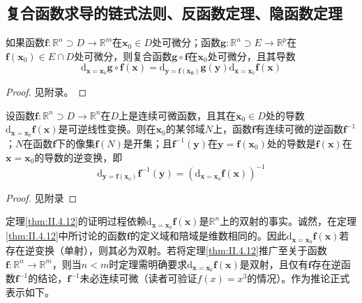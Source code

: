 \documentclass[main.tex]{subfiles}
\begin{document}
\subsection{复合函数求导的链式法则、反函数定理、隐函数定理}
\begin{theorem}[复合函数求导的链式法则]\label{thm:II.4.11}
    如果函数$\mathbf{f}:\mathbb{R}^n\supset D\rightarrow\mathbb{R}^m$在$\mathbf{x}_0\in D$处可微分；函数$\mathbf{g}:\mathbb{R}^n\supset E\rightarrow\mathbb{R}^p$在$\mathbf{f}\left(\mathbf{x}_0\right)\in E\cap D$处可微分，则复合函数$\mathbf{g}\circ\mathbf{f}$在$\mathbf{x}_0$处可微分，且其导数
    \[\mathrm{d}_{\mathbf{x}=\mathbf{x}_0}\mathbf{g}\circ\mathbf{f}\left(\mathbf{x}\right)=\mathrm{d}_{\mathbf{y=\mathbf{f}\left(\mathbf{x}_0\right)}}\mathbf{g}\left(\mathbf{y}\right)\mathrm{d}_{\mathbf{x}=\mathbf{x}_0}\mathbf{f}\left(\mathbf{x}\right)\]
\end{theorem}
\begin{proof}
    见附录。
\end{proof}

\begin{theorem}[反函数定理]\label{thm:II.4.12}
    设函数$\mathbf{f}:\mathbb{R}^n\supset D\rightarrow\mathbb{R}^n$在$D$上是连续可微函数，且其在$\mathbf{x}_0\in D$处的导数$\mathrm{d}_{\mathbf{x}=\mathbf{x}_0}\mathbf{f}\left(\mathbf{x}\right)$是可逆线性变换。则在$\mathbf{x}_0$的某邻域$N$上，函数$\mathbf{f}$有连续可微的逆函数$\mathbf{f}^{-1}$；$N$在函数$\mathbf{f}$下的像集$\mathbf{f}\left(N\right)$是开集；且$\mathbf{f}^{-1}\left(\mathbf{y}\right)$在$\mathbf{y}=\mathbf{f}\left(\mathbf{x}_0\right)$处的导数是$\mathbf{f}\left(\mathbf{x}\right)$在$\mathbf{x}=\mathbf{x}_0$的导数的逆变换，即
    \[\mathrm{d}_{\mathbf{y}=\mathbf{f}\left(\mathbf{x}_0\right)}\mathbf{f}^{-1}\left(\mathbf{y}\right)=\left(\mathrm{d}_{\mathbf{x}=\mathbf{x}_0}\mathbf{f}\left(\mathbf{x}\right)\right)^{-1}\]
\end{theorem}
\begin{proof}
    见附录
\end{proof}

定理\ref{thm:II.4.12}的证明过程依赖$\mathrm{d}_{\mathbf{x}=\mathbf{x}_0}\mathbf{f}\left(\mathbf{x}\right)$是$\mathbb{R}^n$上的双射的事实。诚然，在定理\ref{thm:II.4.12}中所讨论的函数$\mathbf{f}$的定义域和陪域是维数相同的。因此$\mathrm{d}_{\mathbf{x}=\mathbf{x}_0}\mathbf{f}\left(\mathbf{x}\right)$若存在逆变换（单射），则其必为双射。若将定理\ref{thm:II.4.12}推广至关于函数$\mathbf{f}:\mathbb{R}^n\rightarrow\mathbb{R}^m$，则当$n<m$时定理需明确要求$\mathrm{d}_{\mathbf{x}=\mathbf{x}_0}\mathbf{f}\left(\mathbf{x}\right)$是双射，且仅有$\mathbf{f}$存在逆函数$\mathbf{f}^{-1}$的结论，$\mathbf{f}^{-1}$未必连续可微（读者可验证$f\left(x\right)=x^3$的情况）。作为推论正式表示如下。
\end{document}
